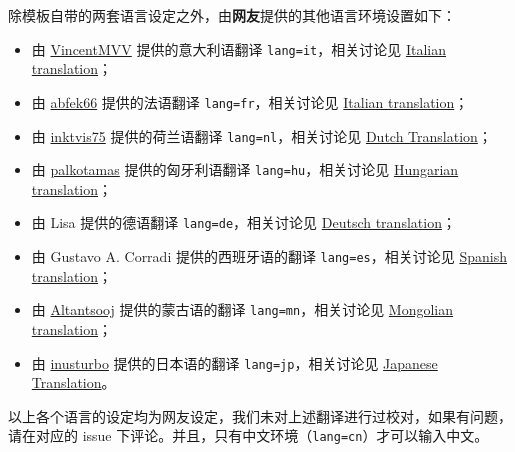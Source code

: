 \documentclass[lang=cn,newtx,10pt,scheme=chinese]{elegantbook}
\begin{document}
除模板自带的两套语言设定之外，由\textbf{网友}提供的其他语言环境设置如下：
\begin{itemize}
  \item 由 \href{https://github.com/VincentMVV}{VincentMVV} 提供的意大利语翻译 \lstinline{lang=it}，相关讨论见 \href{https://github.com/ElegantLaTeX/ElegantBook/issues/85}{Italian translation}；
  \item 由 \href{https://github.com/abfek66}{abfek66} 提供的法语翻译 \lstinline{lang=fr}，相关讨论见 \href{https://github.com/ElegantLaTeX/ElegantBook/issues/85}{Italian translation}；
  \item 由 \href{https://github.com/inktvis75}{inktvis75} 提供的荷兰语翻译 \lstinline{lang=nl}，相关讨论见 \href{https://github.com/ElegantLaTeX/ElegantBook/issues/108}{Dutch Translation}；
  \item 由 \href{https://github.com/palkotamas}{palkotamas} 提供的匈牙利语翻译 \lstinline{lang=hu}，相关讨论见 \href{https://github.com/ElegantLaTeX/ElegantBook/issues/111}{Hungarian translation}；
  \item 由 Lisa 提供的德语翻译 \lstinline{lang=de}，相关讨论见 \href{https://github.com/ElegantLaTeX/ElegantBook/issues/113}{Deutsch translation}；
  \item 由 Gustavo A. Corradi 提供的西班牙语的翻译 \lstinline{lang=es}，相关讨论见 \href{https://github.com/ElegantLaTeX/ElegantBook/issues/133}{Spanish translation}；
  \item 由 \href{https://github.com/Altantsooj}{Altantsooj} 提供的蒙古语的翻译 \lstinline{lang=mn}，相关讨论见 \href{https://github.com/ElegantLaTeX/ElegantBook/issues/137}{Mongolian translation}；
  \item 由 \href{https://github.com/inusturbo}{inusturbo} 提供的日本语的翻译 \lstinline{lang=jp}，相关讨论见 \href{https://github.com/ElegantLaTeX/ElegantBook/issues/172}{Japanese Translation}。
\end{itemize}



\begin{remark}
以上各个语言的设定均为网友设定，我们未对上述翻译进行过校对，如果有问题，请在对应的 issue 下评论。并且，只有中文环境（\lstinline{lang=cn}）才可以输入中文。
\end{remark}
\end{document}
